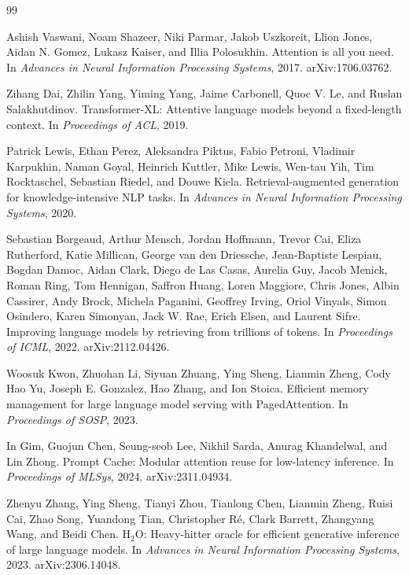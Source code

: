 \documentclass[11pt]{article}
\begin{document}
\begin{thebibliography}{99}

Ashish Vaswani, Noam Shazeer, Niki Parmar, Jakob Uszkoreit, Llion Jones,
Aidan N. Gomez, Lukasz Kaiser, and Illia Polosukhin.
\newblock Attention is all you need.
\newblock In \emph{Advances in Neural Information Processing Systems}, 2017.
\newblock arXiv:1706.03762.

Zihang Dai, Zhilin Yang, Yiming Yang, Jaime Carbonell, Quoc V. Le, and
Ruslan Salakhutdinov.
\newblock Transformer-XL: Attentive language models beyond a fixed-length
context.
\newblock In \emph{Proceedings of ACL}, 2019.

Patrick Lewis, Ethan Perez, Aleksandra Piktus, Fabio Petroni, Vladimir
Karpukhin, Naman Goyal, Heinrich Kuttler, Mike Lewis, Wen-tau Yih, Tim
Rocktaschel, Sebastian Riedel, and Douwe Kiela.
\newblock Retrieval-augmented generation for knowledge-intensive NLP tasks.
\newblock In \emph{Advances in Neural Information Processing Systems}, 2020.

Sebastian Borgeaud, Arthur Mensch, Jordan Hoffmann, Trevor Cai, Eliza
Rutherford, Katie Millican, George van den Driessche, Jean-Baptiste Lespiau,
Bogdan Damoc, Aidan Clark, Diego de Las Casas, Aurelia Guy, Jacob Menick,
Roman Ring, Tom Hennigan, Saffron Huang, Loren Maggiore, Chris Jones, Albin
Cassirer, Andy Brock, Michela Paganini, Geoffrey Irving, Oriol Vinyals, Simon
Osindero, Karen Simonyan, Jack W. Rae, Erich Elsen, and Laurent Sifre.
\newblock Improving language models by retrieving from trillions of tokens.
\newblock In \emph{Proceedings of ICML}, 2022.
\newblock arXiv:2112.04426.

Woosuk Kwon, Zhuohan Li, Siyuan Zhuang, Ying Sheng, Lianmin Zheng, Cody Hao
Yu, Joseph E. Gonzalez, Hao Zhang, and Ion Stoica.
\newblock Efficient memory management for large language model serving with
PagedAttention.
\newblock In \emph{Proceedings of SOSP}, 2023.

In Gim, Guojun Chen, Seung-seob Lee, Nikhil Sarda, Anurag Khandelwal, and
Lin Zhong.
\newblock Prompt Cache: Modular attention reuse for low-latency inference.
\newblock In \emph{Proceedings of MLSys}, 2024.
\newblock arXiv:2311.04934.

Zhenyu Zhang, Ying Sheng, Tianyi Zhou, Tianlong Chen, Lianmin Zheng, Ruisi Cai,
Zhao Song, Yuandong Tian, Christopher R\'e, Clark Barrett, Zhangyang Wang, and
Beidi Chen.
\newblock H$_2$O: Heavy-hitter oracle for efficient generative inference of
large language models.
\newblock In \emph{Advances in Neural Information Processing Systems}, 2023.
\newblock arXiv:2306.14048.


\end{thebibliography}
\end{document}
